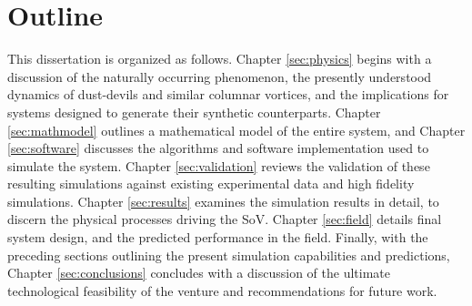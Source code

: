 %

\section{Outline}

This dissertation is organized as follows. Chapter \ref{sec:physics} begins
with a discussion of the naturally occurring phenomenon, the presently
understood dynamics of dust-devils and similar columnar vortices, and
the implications for systems designed to generate their synthetic
counterparts.  
Chapter \ref{sec:mathmodel} outlines a mathematical model of
the entire system, and Chapter \ref{sec:software} discusses the
algorithms and software implementation used to simulate the
system. Chapter \ref{sec:validation} reviews the validation of
these resulting simulations against existing experimental data and high 
fidelity simulations.  
Chapter \ref{sec:results} examines the simulation results in detail, to
discern the physical processes driving the SoV. Chapter \ref{sec:field}
details final system design, and the predicted performance in the
field.  
%
%
%
%
Finally, with the preceding sections outlining the present simulation
capabilities and predictions, Chapter \ref{sec:conclusions} concludes
with a discussion of the ultimate technological feasibility of the
venture and recommendations for future work. 

%
